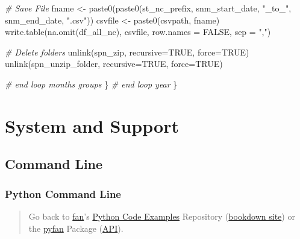\documentclass[
]{book}
\newenvironment{Shaded}{\begin{snugshade}}{\end{snugshade}}
\newcommand{\AttributeTok}[1]{\textcolor[rgb]{0.77,0.63,0.00}{#1}}
\newcommand{\CommentTok}[1]{\textcolor[rgb]{0.56,0.35,0.01}{\textit{#1}}}
\newcommand{\ConstantTok}[1]{\textcolor[rgb]{0.00,0.00,0.00}{#1}}
\newcommand{\FunctionTok}[1]{\textcolor[rgb]{0.00,0.00,0.00}{#1}}
\newcommand{\NormalTok}[1]{#1}
\newcommand{\OtherTok}[1]{\textcolor[rgb]{0.56,0.35,0.01}{#1}}
\newcommand{\StringTok}[1]{\textcolor[rgb]{0.31,0.60,0.02}{#1}}
\begin{document}
\begin{Shaded}
\begin{Highlighting}[]
    \CommentTok{\# Save File}
\NormalTok{    fname }\OtherTok{\textless{}{-}} \FunctionTok{paste0}\NormalTok{(}\FunctionTok{paste0}\NormalTok{(st\_nc\_prefix,}
\NormalTok{                           snm\_start\_date, }\StringTok{"\_to\_"}\NormalTok{, snm\_end\_date,}
                           \StringTok{".csv"}\NormalTok{))}
\NormalTok{    csvfile }\OtherTok{\textless{}{-}} \FunctionTok{paste0}\NormalTok{(csvpath, fname)}
    \FunctionTok{write.table}\NormalTok{(}\FunctionTok{na.omit}\NormalTok{(df\_all\_nc), csvfile, }\AttributeTok{row.names =} \ConstantTok{FALSE}\NormalTok{, }\AttributeTok{sep =} \StringTok{","}\NormalTok{)}

    \CommentTok{\# Delete folders}
    \FunctionTok{unlink}\NormalTok{(spn\_zip, }\AttributeTok{recursive=}\ConstantTok{TRUE}\NormalTok{, }\AttributeTok{force=}\ConstantTok{TRUE}\NormalTok{)}
    \FunctionTok{unlink}\NormalTok{(spn\_unzip\_folder, }\AttributeTok{recursive=}\ConstantTok{TRUE}\NormalTok{, }\AttributeTok{force=}\ConstantTok{TRUE}\NormalTok{)}

  \CommentTok{\# end loop months groups}
\NormalTok{  \}}
\CommentTok{\# end loop year}
\NormalTok{\}}
\end{Highlighting}
\end{Shaded}

\hypertarget{system-and-support}{%
\chapter{System and Support}\label{system-and-support}}

\hypertarget{command-line}{%
\section{Command Line}\label{command-line}}

\hypertarget{python-command-line}{%
\subsection{Python Command Line}\label{python-command-line}}

\begin{quote}
Go back to \href{http://fanwangecon.github.io/}{fan}'s \href{https://fanwangecon.github.io/Py4Econ/}{Python Code Examples} Repository (\href{https://fanwangecon.github.io/Py4Econ/bookdown}{bookdown site}) or the \href{https://pyfan.readthedocs.io/en/latest/}{pyfan} Package (\href{https://pyfan.readthedocs.io/en/latest/reference.html}{API}).
\end{quote}
\end{document}
